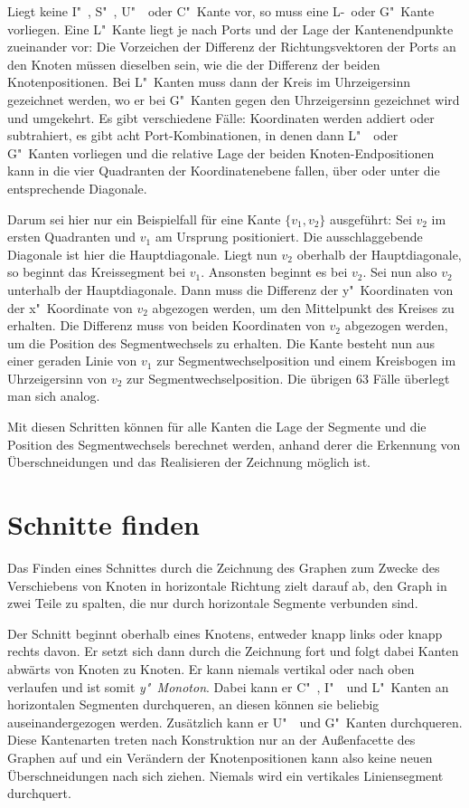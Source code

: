 \documentclass[a4paper]{scrreprt}
\theoremstyle{definition}
\begin{document}
Liegt keine I"~, S"~, U"~~oder C"~Kante vor, so muss eine L-~oder G"~Kante vorliegen. Eine L"~Kante liegt je nach Ports und der Lage der Kantenendpunkte zueinander vor: Die Vorzeichen der Differenz der Richtungsvektoren der Ports an den Knoten müssen dieselben sein, wie die der Differenz der beiden Knotenpositionen. Bei L"~Kanten muss dann der Kreis im Uhrzeigersinn gezeichnet werden, wo er bei G"~Kanten gegen den Uhrzeigersinn gezeichnet wird und umgekehrt. Es gibt verschiedene Fälle: Koordinaten werden addiert oder subtrahiert, es gibt acht Port-Kombinationen, in denen dann L"~~oder G"~Kanten vorliegen und die relative Lage der beiden Knoten-Endpositionen kann in die vier Quadranten der Koordinatenebene fallen, über oder unter die entsprechende Diagonale.

Darum sei hier nur ein Beispielfall für eine Kante $\{v_1, v_2\}$ ausgeführt: Sei $v_2$ im ersten Quadranten und $v_1$ am Ursprung positioniert. Die ausschlaggebende Diagonale ist hier die Hauptdiagonale. Liegt nun $v_2$ oberhalb der Hauptdiagonale, so beginnt das Kreissegment bei $v_1$. Ansonsten beginnt es bei $v_2$. Sei nun also $v_2$ unterhalb der Hauptdiagonale. Dann muss die Differenz der y"~Koordinaten von der x"~Koordinate von $v_2$ abgezogen werden, um den Mittelpunkt des Kreises zu erhalten. Die Differenz muss von beiden Koordinaten von $v_2$ abgezogen werden, um die Position des Segmentwechsels zu erhalten. Die Kante besteht nun aus einer geraden Linie von $v_1$ zur Segmentwechselposition und einem Kreisbogen im Uhrzeigersinn von $v_2$ zur Segmentwechselposition. Die übrigen 63 Fälle überlegt man sich analog.

Mit diesen Schritten können für alle Kanten die Lage der Segmente und die Position des Segmentwechsels berechnet werden, anhand derer die Erkennung von Überschneidungen und das Realisieren der Zeichnung möglich ist.

\section{Schnitte finden}
\label{sec:cutfinding}

Das Finden eines Schnittes durch die Zeichnung des Graphen zum Zwecke des Verschiebens von Knoten in horizontale Richtung zielt darauf ab, den Graph in zwei Teile zu spalten, die nur durch horizontale Segmente verbunden sind. 

Der Schnitt beginnt oberhalb eines Knotens, entweder knapp links oder knapp rechts davon. Er setzt sich dann durch die Zeichnung fort und folgt dabei Kanten abwärts von Knoten zu Knoten. Er kann niemals vertikal oder nach oben verlaufen und ist somit \emph{y"~Monoton}. Dabei kann er C"~, I"~~und L"~Kanten an horizontalen Segmenten durchqueren, an diesen können sie beliebig auseinandergezogen werden. Zusätzlich kann er U"~~und G"~Kanten durchqueren. Diese Kantenarten treten nach Konstruktion nur an der Außenfacette des Graphen auf und ein Verändern der Knotenpositionen kann also keine neuen Überschneidungen nach sich ziehen. Niemals wird ein vertikales Liniensegment durchquert.
\end{document}
